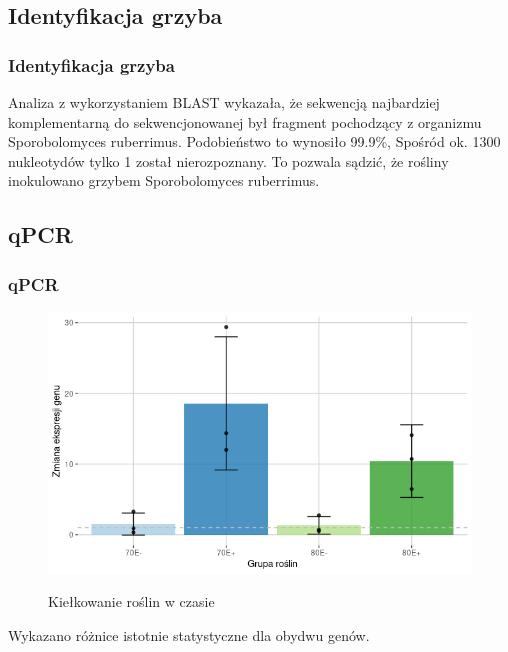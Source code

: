\documentclass{beamer}
\begin{document}
\subsection{Identyfikacja grzyba}
\begin{frame}
    \frametitle{Identyfikacja grzyba}
    Analiza z wykorzystaniem BLAST wykazała, że sekwencją najbardziej komplementarną do
    sekwencjonowanej był fragment pochodzący z organizmu Sporobolomyces ruberrimus. Podobieństwo 
    to wynosiło 99.9\%, Spośród ok. 1300 nukleotydów tylko 1 został nierozpoznany. To
    pozwala sądzić, że rośliny inokulowano grzybem Sporobolomyces ruberrimus.
\end{frame}

\subsection{qPCR}
\begin{frame}
    \frametitle{qPCR}
    \begin{figure}
        \centering
        \includegraphics[scale=0.4]{qpcr.png}\\
        \caption*\hfill{\scriptsize Kiełkowanie roślin w czasie}%
    \end{figure}
    \small Wykazano różnice istotnie statystyczne dla obydwu genów.
\end{frame}
\end{document}
